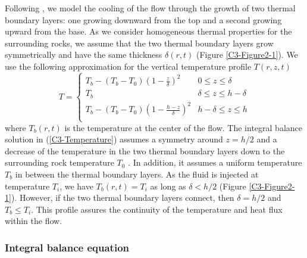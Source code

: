 Following \citet{BALMFORTH:1999ey},  we model the cooling  of the flow
through  the  growth  of  two thermal  boundary  layers:  one  growing
downward from the  top and a second growing upward  from the base.  As
we consider homogeneous thermal  properties for the surrounding rocks,
we assume that the two  thermal boundary layers grow symmetrically and
have the same thickness $\delta(r,t)$ (Figure \ref{C3-Figure2-1}).  We
use the  following approximation for the  vertical temperature profile
$T(r,z,t)$
\begin{equation}
  T=
  \begin{cases}
    T_b - (T_b-T_0)(1-\frac{z}{\delta})^2 & 0 \le z\le \delta \\
    T_b & \delta \le z\le h-\delta \\
    T_b - (T_b-T_0)(1-\frac{h-z}{\delta})^2 & h-\delta \le z\le h\\
  \end{cases}
  \label{C3-Temperature}
\end{equation}
where $T_b(r,t)$  is the temperature at  the center of the  flow.  The
integral balance solution in (\ref{C3-Temperature}) assumes a symmetry
around $z=h/2$  and a decrease of  the temperature in the  two thermal
boundary  layers  down  to  the  surrounding  rock  temperature  $T_0$
\citep{BALMFORTH:1999ey}.    In  addition,   it   assumes  a   uniform
temperature  $T_b$ in  between the  thermal boundary  layers.  As  the
fluid is  injected at  temperature $T_i$, we  have $T_b(r,t)  =T_i$ as
long as $\delta<h/2$ (Figure \ref{C3-Figure2-1}).  However, if the two
thermal boundary layers connect, then $\delta = h/2$ and $T_b\le T_i$.
This profile assures  the continuity of the temperature  and heat flux
within the flow.


\subsubsection{Integral balance equation}
\label{C3-sec:integr-balance-equat}

